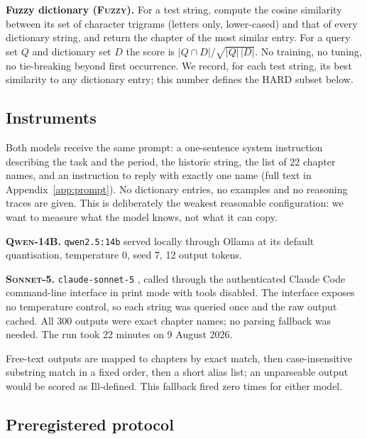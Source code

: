 \documentclass[11pt]{article}
\newcommand{\Bfuzzy}{\textsc{Fuzzy}}
\newcommand{\Mcomm}{\textsc{Sonnet-5}}
\newcommand{\Mlocal}{\textsc{Qwen-14B}}
\begin{document}
\textbf{Fuzzy dictionary (\Bfuzzy).} For a test string, compute the cosine similarity between its set of character trigrams (letters only, lower-cased) and that of every dictionary string, and return the chapter of the most similar entry. For a query set $Q$ and dictionary set $D$ the score is $|Q\cap D|/\sqrt{|Q|\,|D|}$. No training, no tuning, no tie-breaking beyond first occurrence. We record, for each test string, its best similarity to any dictionary entry; this number defines the HARD subset below.

\subsection{Instruments}

Both models receive the same prompt: a one-sentence system instruction describing the task and the period, the historic string, the list of 22 chapter names, and an instruction to reply with exactly one name (full text in Appendix~\ref{app:prompt}). No dictionary entries, no examples and no reasoning traces are given. This is deliberately the weakest reasonable configuration: we want to measure what the model knows, not what it can copy.

\textbf{\Mlocal.} \texttt{qwen2.5:14b} \citep{qwen2.5} served locally through Ollama at its default quantisation, temperature 0, seed 7, 12 output tokens.

\textbf{\Mcomm.} \texttt{claude-sonnet-5} \citep{anthropic2026sonnet5}, called through the authenticated Claude Code command-line interface in print mode with tools disabled. The interface exposes no temperature control, so each string was queried once and the raw output cached. All 300 outputs were exact chapter names; no parsing fallback was needed. The run took 22 minutes on 9 August 2026.

Free-text outputs are mapped to chapters by exact match, then case-insensitive substring match in a fixed order, then a short alias list; an unparseable output would be scored as Ill-defined. This fallback fired zero times for either model.

\subsection{Preregistered protocol}
\end{document}
